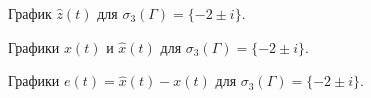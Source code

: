 \begin{figure}[!h]
\caption{График $\hat{z}(t)$ для $ \sigma_3 (\Gamma) = \{ -2 \pm i \}$.}
\label{3_z_nlin_02_LW4}
\end{figure}

\begin{figure}[!h]
\caption{Графики $x(t)$ и $\hat{x}(t)$ для $ \sigma_3 (\Gamma) = \{ -2 \pm i \}$.}
\label{3_xx_nlin_02_LW4}
\end{figure}

\begin{figure}[!h]
\caption{Графики $e (t) =\hat{x}(t) - x(t)$ для $ \sigma_3 (\Gamma) = \{ -2 \pm i \}$.}
\label{3_e_nlin_02_LW4}
\end{figure}





